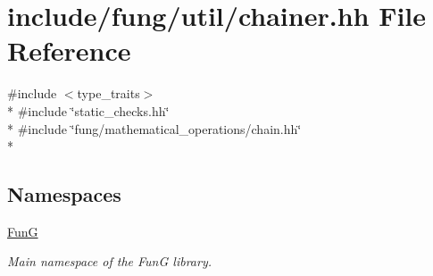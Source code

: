 \hypertarget{chainer_8hh}{}\section{include/fung/util/chainer.hh File Reference}
\label{chainer_8hh}
{\ttfamily \#include $<$type\+\_\+traits$>$}\\*
{\ttfamily \#include \char`\"{}static\+\_\+checks.\+hh\char`\"{}}\\*
{\ttfamily \#include \char`\"{}fung/mathematical\+\_\+operations/chain.\+hh\char`\"{}}\\*
\subsection*{Namespaces}
\begin{DoxyCompactItemize}
\item 
 \hyperlink{namespaceFunG}{FunG}
\begin{DoxyCompactList}\small\item\em Main namespace of the FunG library. \end{DoxyCompactList}\end{DoxyCompactItemize}
